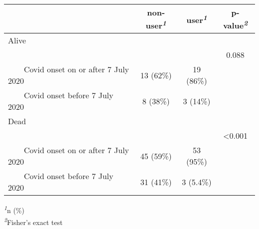 \setlength{\LTpost}{0mm}
\begin{longtable}{lccc}
\toprule
 & \textbf{non-user}\textsuperscript{\textit{1}} & \textbf{user}\textsuperscript{\textit{1}} & \textbf{p-value}\textsuperscript{\textit{2}} \\ 
\midrule
\multicolumn{4}{l}{Alive} \\ 
\midrule
 &  &  & 0.088 \\ 
    Covid onset on or after 7 July 2020 & 13 (62\%) & 19 (86\%) &  \\ 
    Covid onset before 7 July 2020 & 8 (38\%) & 3 (14\%) &  \\ 
\midrule
\multicolumn{4}{l}{Dead} \\ 
\midrule
 &  &  & <0.001 \\ 
    Covid onset on or after 7 July 2020 & 45 (59\%) & 53 (95\%) &  \\ 
    Covid onset before 7 July 2020 & 31 (41\%) & 3 (5.4\%) &  \\ 
\bottomrule
\end{longtable}
\begin{minipage}{\linewidth}
\textsuperscript{\textit{1}}n (\%)\\
\textsuperscript{\textit{2}}Fisher's exact test\\
\end{minipage}

